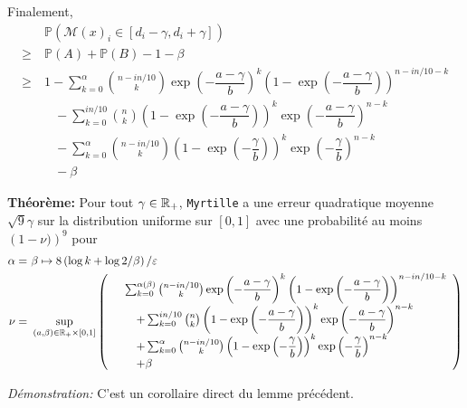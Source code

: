 Finalement,
\begin{align*}
    &\  \mathbb P\left(  \mathcal M(x)_i \in [d_i - \gamma, d_i + \gamma] \right)  \\
    \geq &\   \mathbb P(A) + \mathbb P (B) - 1 - \beta \\
    \geq &\  1 - \sum_{k = 0}^{\alpha} \binom{n - in/10}{k}\exp\left( -\dfrac{a-\gamma}{b} \right)^k \left( 1 - \exp\left( -\dfrac{a-\gamma}{b} \right) \right)^{n - in/10 -k} \\
    & \quad  - \sum_{k = 0}^{in/10} \binom{n}{k} \left( 1 - \exp\left( -\dfrac{a-\gamma}{b} \right) \right)^k \exp\left( -\dfrac{a-\gamma}{b} \right)^{n-k} \\
    & \quad - \sum_{k = 0}^{\alpha} \binom{n - in/10}{k} \left( 1 - \exp\left( -\dfrac{\gamma}{b} \right) \right)^k \exp\left( -\dfrac{\gamma}{b} \right)^{n-k}\\
    & \quad - \beta
\end{align*}

\vspace*{5pt}
\textbf{Théorème: } Pour tout \(\gamma \in \mathbb{R}_+\), \texttt{Myrtille} a une erreur quadratique moyenne \(\sqrt{9}\gamma\) sur la distribution uniforme sur \([0,1]\) avec une probabilité au moins \(\left( 1 - \nu) \right)^9\) pour 
\begin{align*}
    \alpha =&\ \beta \mapsto 8\left( \log k + \log 2/\beta \right)/\varepsilon\\
    \nu = &\ \sup_{(a,\beta) \in \R_+ \times [0,1]} \left( 
        \begin{array}[]{rl}
            &\sum_{k = 0}^{\alpha(\beta)} \binom{n - in/10}{k}\exp\left( -\dfrac{a-\gamma}{b} \right)^k \left( 1 - \exp\left( -\dfrac{a-\gamma}{b} \right) \right)^{n - in/10 -k} \\
            & \quad  + \sum_{k = 0}^{in/10} \binom{n}{k} \left( 1 - \exp\left( -\dfrac{a-\gamma}{b} \right) \right)^k \exp\left( -\dfrac{a-\gamma}{b} \right)^{n-k} \\
            & \quad + \sum_{k = 0}^{\alpha} \binom{n - in/10}{k} \left( 1 - \exp\left( -\dfrac{\gamma}{b} \right) \right)^k \exp\left( -\dfrac{\gamma}{b} \right)^{n-k}\\
            & \quad + \beta 
        \end{array}
    \right)
\end{align*}

\textit{Démonstration:} C'est un corollaire direct du lemme précédent. 


